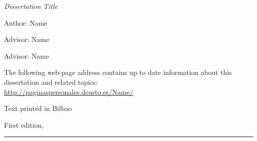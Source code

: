 
\thispagestyle{empty}

\hfill

\vfill

\medskip


\noindent
\textit{
Dissertation Title
}




Author: Name

Advisor: Name

Advisor: Name



\vfill

\vfill

\noindent
The following web-page address contains up to date information about this dissertation and related topics: \\
\url{http://paginaspersonales.deusto.es/Name/}


\noindent
Text printed in Bilbao

\noindent
First edition, 
\monthname \ \the\year

\vspace{1cm}
\hrule
\bigskip

\cleardoublepage

%
%
%
%
%
%

